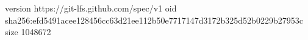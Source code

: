 version https://git-lfs.github.com/spec/v1
oid sha256:efd5491acee128456cc63d21ee112b50e7717147d3172b325d52b0229b27953c
size 1048672
